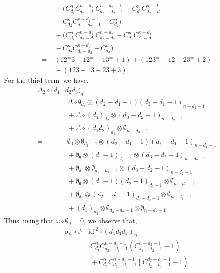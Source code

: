 \documentclass[5p,twocolumn]{elsarticle}
\newcommand*{\id}{{\mathrm{id}}}
\newcommand*{\cendot}{\boldsymbol{\cdot}}
\begin{document}
\begin{example}
\begin{align*}
                  &\;+\bigl(C_{d_1}^nC_{d_2-d_1}^{n-d_1}C_{d_3-d_2-1}^{n-d_2-1}-C_{d_1}^nC_{d_2-d_1}^{n-d_1}\\
                  &\;-C_{d_2}^nC_{d_3-d_2-1}^{n-d_2-1}+C_{d_2}^n\bigr)\\
                  &\;+\bigl(C_{d_1}^nC_{d_2-d_1}^{n-d_1}C_{d_3-d_2}^{n-d_2}-C_{d_1}^nC_{d_3-d_1}^{n-d_1}\\
                  &\;-C_{d_2}^nC_{d_3-d_2}^{n-d_2}+C_{d_3}^n\bigr)\\
                 =&\;(12^=3-12^=-13^=+1)+(123^=-12-23^=+2)\\
                  &\;+(123-13-23+3).               
  \end{align*}
  For the third term, we have,
  \begin{align*}
    \Delta_2\circ(d_1&d_2d_3)_n\\
          =&\;\Delta\circ\emptyset_{d_1}\otimes(d_2-d_1-1)(d_3-d_1-1)_{n-d_1-1}\\
                              &\;+\Delta\circ(d_1)_{d_2}\otimes(d_3-d_2-1)_{n-d_2-1}\\
                              &\;+\Delta\circ(d_1d_2)_{d_3}\otimes\emptyset_{n-d_3-1}\\
                             =&\;\emptyset_0\otimes\emptyset_{d_1-1}\otimes(d_2-d_1-1)(d_3-d_1-1)_{n-d_1-1}\\
                              &\;+\emptyset_{0}\otimes(d_1-1)_{d_2-1}\otimes(d_3-d_2-1)_{n-d_2-1}\\
                              &\;+\emptyset_{d_1}\otimes\emptyset_{d_2-d_1-1}\otimes(d_3-d_2-1)_{n-d_2-1}\\
                              &\;+\emptyset_0\otimes(d_1-1)(d_2-1)_{d_3-1}\otimes\emptyset_{n-d_3-1}\\
                              &\;+\emptyset_{d_1}\otimes(d_2-d_1-1)_{d_3-d_2-1}\otimes\emptyset_{n-d_3-1}\\
                              &\;+(d_1)_{d_2}\otimes\emptyset_{d_3-d_2-1}\otimes\emptyset_{n-d_3-1}.
  \end{align*}
  Thus, using that $\omega\circ\emptyset_d=0$, we observe that,
  \begin{align*}
    \sigma_n\circ J\cendot&\id^{\cendot2}\circ (d_1d_2d_3)_n\\
           =&\;C_{d_1}^{n}C_{d_2-d_1-1}^{n-d_1-1}(C_{d_3-d_2-1}^{n-d_2-1}-1)\\
           &\;+C_{d_1}^{n}C_{d_3-d_1-1}^{n-d_1-1}(C_{d_2-d_1-1}^{d_3-d_1-1}-1)\\

\end{align*}
\end{example}
\end{document}
